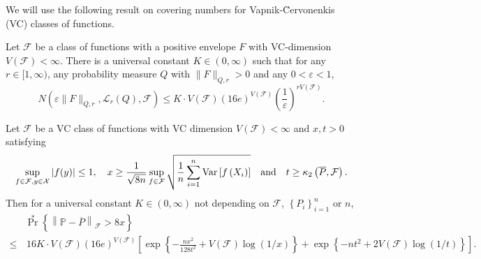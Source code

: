 We will use the following result on covering numbers for Vapnik-{\u C}ervonenkis
(VC)
classes of functions.

\begin{lemma}
\label{lem--VC-coverin-number}
Let \(\mathcal{F}\) be a class of functions with a positive envelope \(F\) with
VC-dimension \(V (\mathcal{F}) < \infty\).
There is a universal constant \(K \in (0, \infty)\) such that for any \(r \in
[1, \infty)\), any probability measure \(Q\) with \(\|F\|_{Q, r} > 0\) and any
\(0 < \varepsilon < 1\),
\begin{equation}
  N \left( \varepsilon \|F\|_{Q, r}, \mathscr{L}_{r} (Q), \mathcal{F} \right)
  \leq K \cdot V (\mathcal{F}) (16 e)^{V (\mathcal{F})} \left(
  \frac{1}{\varepsilon} \right)^{r V (\mathcal{F})}.
  \label{eqn--VC-coverin-number}
\end{equation}
\end{lemma}

\begin{theorem}
\label{thm--ep-prob-ineq-no-chain-VC}
Let \(\mathcal{F}\) be a VC class of functions with VC dimension \(V
(\mathcal{F}) < \infty\) and \(x, t > 0\) satisfying
\begin{equation*}
  \sup_{f \in \mathcal{F}, y \in
  \mathcal{X}} |f (y)| \leq 1, \quad x \geq \frac{1}{\sqrt{8 n}} \sup_{f \in
  \mathcal{F}} \sqrt{\frac{1}{n} \sum_{i = 1}^{n} \mathrm{Var} \left[ f \left( X_{i}
  \right) \right]} \quad \text{and} \quad t \geq \kappa_{2} \left( \overline{P},
  \mathcal{F} \right).
\end{equation*}
Then for a universal constant \(K \in (0, \infty)\) not depending on
\(\mathcal{F}\), \(\left\{ P_{i} \right\}_{i = 1}^{n}\) or \(n\),
\begin{equation}
  \begin{split}
    & \Pr^{\ast} \left\{ \left\| \mathbb{P} - \overline{P}
    \right\|_{\mathcal{F}} > 8 x \right\} \\
    \leq
    & \, 16 K \cdot V (\mathcal{F}) (16 e)^{V (\mathcal{F})} \left[ \exp \left\{
    -
    \frac{n x^{2}}{128 t^{2}} + V (\mathcal{F}) \log (1 / x) \right\} + \exp
    \left\{ - n t^{2} + 2 V (\mathcal{F}) \log (1 / t) \right\} \right].
  \end{split}
  \label{eqn--ep-prob-ineq-no-chain-VC}
\end{equation}
\end{theorem}

